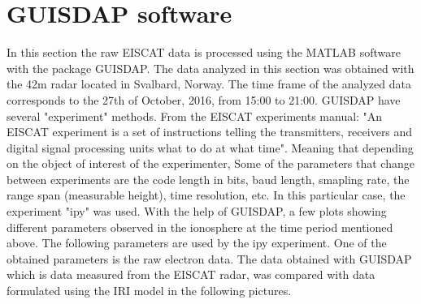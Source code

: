 
\section{GUISDAP software}
In this section the raw EISCAT data is processed using the MATLAB software with the package GUISDAP. The data analyzed in this section was obtained with the 42m radar located in Svalbard, Norway. The time frame of the analyzed data corresponds to the 27th of October, 2016, from 15:00 to 21:00.
\newline
\newline
GUISDAP have several "experiment" methods. From the EISCAT experiments manual: "An EISCAT experiment is a set of instructions telling the transmitters, receivers and digital signal processing units what to do at what time". Meaning that depending on the object of interest of the experimenter, Some of the parameters that change between experiments are the code length in bits, baud length, smapling rate, the range span (measurable height), time resolution, etc. In this particular case, the experiment "ipy" was used. 
%	
\newline
\newline
With the help of GUISDAP, a few plots showing different parameters observed in the ionosphere at the time period mentioned above. The following parameters are used by the ipy experiment. One of the obtained parameters is the raw electron data. The data obtained with GUISDAP which is data measured from the EISCAT radar, was compared with data formulated using the IRI model in the following pictures.

